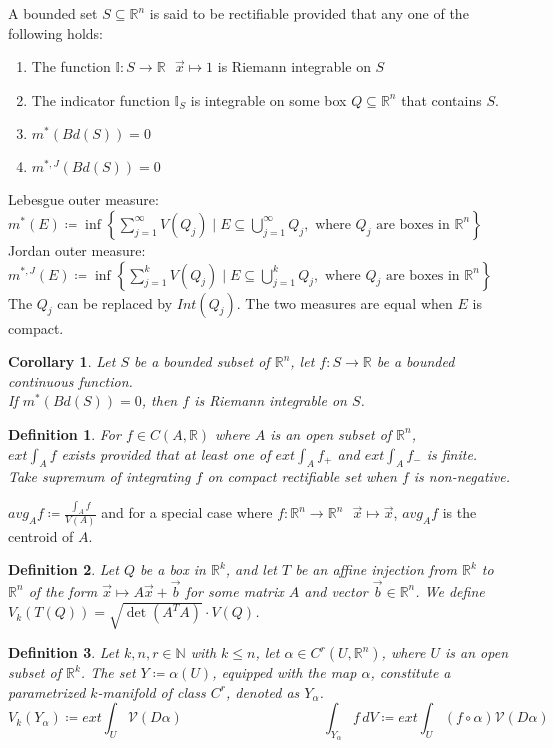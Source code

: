 \documentclass[11pt]{article}
\theoremstyle{break}
\theoremstyle{break}
\newtheorem{corT}[lem]{Corollary}
\newtheorem{defn}{Definition}[corL]
\newcommand{\R}{\mathbb{R}}
\newcommand{\N}{\mathbb{N}}
\begin{document}
A bounded set $S \subseteq \R^n$ is said to be rectifiable provided that any one of the following holds:
\begin{enumerate}[topsep=3pt,itemsep=-1ex,partopsep=1ex,parsep=1ex]
\item The function $\mathbb{I}:S \to \R \ \ \ \vec{x}\mapsto 1$ is Riemann integrable on $S$
\item The indicator function $\mathbb{I}_S$ is integrable on some box $Q\subseteq \R^n$ that contains $S$.
\item $m^*(Bd(S)) = 0$
\item $m^{*,J}(Bd(S)) = 0$
\end{enumerate}
Lebesgue outer measure: $m^*(E) \coloneqq  \inf\left\{\sum_{j=1}^\infty V(Q_j) \mid E \subseteq \bigcup_{j=1}^\infty Q_j, \text{ where } Q_j \text{ are boxes in }\R^n \right\} $\\
Jordan outer measure: $m^{*,J}(E) \coloneqq  \inf\left\{\sum_{j=1}^k V(Q_j) \mid E \subseteq \bigcup_{j=1}^k Q_j, \text{ where } Q_j \text{ are boxes in }\R^n \right\} $\\
The $Q_j$ can be replaced by $Int(Q_j)$. The two measures are equal when $E$ is compact.
\begin{corT}
Let $S$ be a bounded subset of $\R^n$, let $f:S \to \R$ be a bounded continuous function.\\ 
If $m^*(Bd(S)) = 0$, then $f$ is Riemann integrable on $S$. 
\end{corT}

\begin{defn}
For $f \in C(A,\R)$ where $A$ is an open subset of $\R^n$, \\$ext \int_A f$ exists provided that at least one of $ext \int_A f_+$ and $ext \int_A f_-$ is finite. \\Take supremum of integrating $f$ on compact rectifiable set when $f$ is non-negative. \end{defn}

$avg_A f\coloneqq \frac{\int_A f}{V(A)}$ and for a special case where $f:\R^n \to \R^n \ \ \ \vec{x}\mapsto \vec{x}$, $avg_A f$ is the centroid of $A$.

\begin{defn}
Let $Q$ be a box in $\R^k$, and let $T$ be an affine injection from $\R^k$ to $\R^n$ of the form $\vec{x}\mapsto A\vec{x}+\vec{b}$ for some matrix $A$ and vector $\vec{b}\in \R^n$. We define $V_k(T(Q)) = \sqrt{\det(A^TA)}\cdot V(Q)$. 
\end{defn}

\begin{defn}
Let $k,n,r\in \N$ with $k \leq n$, let $\alpha \in C^r(U, \R^n)$, where $U$ is an open subset of $\R^k$.  The set $Y \coloneqq \alpha(U)$, equipped with the map $\alpha$, constitute a parametrized $k$-manifold of class $C^r$, denoted as $Y_\alpha$. 
$$V_k(Y_\alpha) \coloneqq ext \int_U \mathcal{V}(D\alpha)\qquad\qquad\qquad\qquad\qquad \int_{Y_\alpha} f\, dV \coloneqq ext \int_U (f\circ \alpha) \mathcal{V}(D\alpha)$$
\end{defn}
\end{document}
